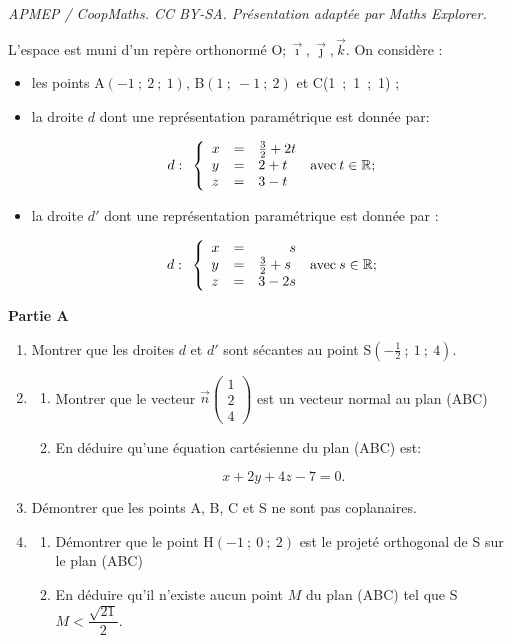 \documentclass[10pt]{article}
\providecommand{\R}{\mathbb{R}}
\providecommand{\vect}[1]{\overrightarrow{#1}}
\providecommand{\Oijk}{\(\mathrm{O};\vec{\imath},\vec{\jmath},\vec{k}\)}
\begin{document}
\noindent\textit{APMEP / CoopMaths. CC BY-SA. Présentation adaptée par Maths Explorer.}\par\medskip
\medskip

L'espace est muni d'un repère orthonormé \Oijk. On considère :

\begin{itemize}[label=$\bullet~$]
\item les points A$(-1~;~2~;~1)$, \:B$(1~;~-1~;~2)$ et C(1~;~1~;~1) ;
\item la droite $d$ dont une représentation paramétrique est donnée par:

\[d : \:\: \left\{\begin{array}{l c l}
x& =& \frac 32 + 2t\\
y&=&2 +t\\
z&=&3 - t 
\end{array}\right. \:\text{avec}\: t \in\R ;\]
\item la droite $d'$ dont une représentation paramétrique est donnée par :

\[d : \:\: \left\{\begin{array}{l c l}
x& =&\phantom{3 - 2}s\\
y&=&\frac 32 + s\\
z&=&3 - 2s 
\end{array}\right. \:\text{avec}\: s \in\R ;\]
\end{itemize}

\medskip

\begin{center}\textbf{Partie A} \end{center}

\smallskip

\begin{enumerate}
\item Montrer que les droites $d$ et $d'$ sont sécantes au point S$\left(- \frac 12~;~1~;~4\right)$.
\item 
	\begin{enumerate}
		\item Montrer que le vecteur $\vect{n}\begin{pmatrix} 1\\2\\4\end{pmatrix}$ est un vecteur normal au plan (ABC) 
		\item En déduire qu'une équation cartésienne du plan (ABC) est:

\[x + 2y + 4z - 7 = 0.\]
	\end{enumerate}
\item Démontrer que les points A, B, C et S ne sont pas coplanaires.
\item 
	\begin{enumerate}
		\item Démontrer que le point H$(-1~;~0~;~2)$ est le projeté orthogonal de S sur le plan (ABC)
		\item En déduire qu'il n'existe aucun point $M$ du plan (ABC) tel que S$M < \dfrac{\sqrt{21}}{2}$.
	\end{enumerate}
\end{enumerate}
\end{document}
